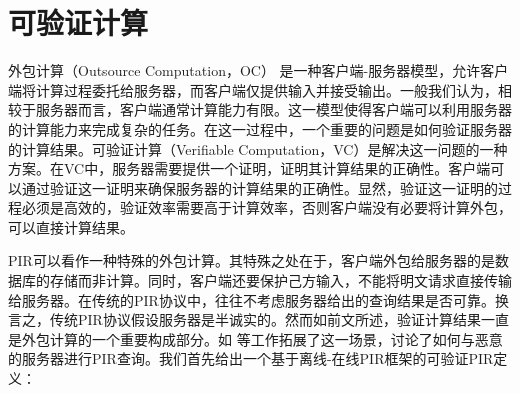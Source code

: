\section{可验证计算}
外包计算（Outsource Computation，OC） \cite{USENIX:GreHohWat11, C:ChuKalVad10} 是一种客户端-服务器模型，允许客户端将计算过程委托给服务器，而客户端仅提供输入并接受输出。一般我们认为，相较于服务器而言，客户端通常计算能力有限。这一模型使得客户端可以利用服务器的计算能力来完成复杂的任务。在这一过程中，一个重要的问题是如何验证服务器的计算结果。可验证计算（Verifiable Computation，VC）是解决这一问题的一种方案。在VC中，服务器需要提供一个证明，证明其计算结果的正确性。客户端可以通过验证这一证明来确保服务器的计算结果的正确性。显然，验证这一证明的过程必须是高效的，验证效率需要高于计算效率，否则客户端没有必要将计算外包，可以直接计算结果。

PIR可以看作一种特殊的外包计算。其特殊之处在于，客户端外包给服务器的是数据库的存储而非计算。同时，客户端还要保护己方输入，不能将明文请求直接传输给服务器。在传统的PIR协议中，往往不考虑服务器给出的查询结果是否可靠。换言之，传统PIR协议假设服务器是半诚实的。然而如前文所述，验证计算结果一直是外包计算的一个重要构成部分。如 \cite{VeriSimplePIR, APIR, SVPIR18} 等工作拓展了这一场景，讨论了如何与恶意的服务器进行PIR查询。我们首先给出一个基于离线-在线PIR框架的可验证PIR定义：

